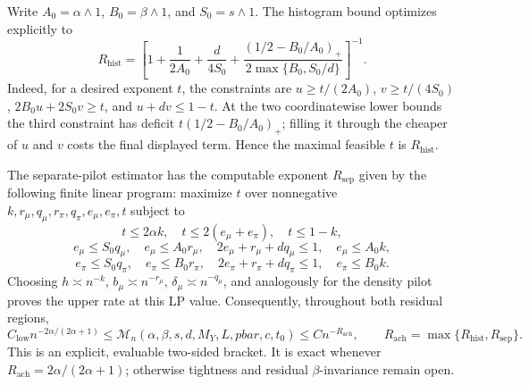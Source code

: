Write \(A_0=\alpha\wedge1\), \(B_0=\beta\wedge1\), and \(S_0=s\wedge1\). The histogram bound optimizes explicitly to
\[
R_{\mathrm{hist}}=\left[1+\frac1{2A_0}+\frac{d}{4S_0}+\frac{(1/2-B_0/A_0)_+}{2\max\{B_0,S_0/d\}}\right]^{-1}.
\]
Indeed, for a desired exponent \(t\), the constraints are \(u\ge t/(2A_0)\), \(v\ge t/(4S_0)\), \(2B_0u+2S_0v\ge t\), and \(u+dv\le1-t\). At the two coordinatewise lower bounds the third constraint has deficit \(t(1/2-B_0/A_0)_+\); filling it through the cheaper of \(u\) and \(v\) costs the final displayed term. Hence the maximal feasible \(t\) is \(R_{\mathrm{hist}}\).

The separate-pilot estimator has the computable exponent \(R_{\mathrm{sep}}\) given by the following finite linear program: maximize \(t\) over nonnegative \(k,r_\mu,q_\mu,r_\pi,q_\pi,e_\mu,e_\pi,t\) subject to
\[
t\le2\alpha k,
\quad t\le2(e_\mu+e_\pi),
\quad t\le1-k,
\]
\[
e_\mu\le S_0q_\mu,
\quad e_\mu\le A_0r_\mu,
\quad 2e_\mu+r_\mu+dq_\mu\le1,
\quad e_\mu\le A_0k,
\]
\[
e_\pi\le S_0q_\pi,
\quad e_\pi\le B_0r_\pi,
\quad 2e_\pi+r_\pi+dq_\pi\le1,
\quad e_\pi\le B_0k.
\]
Choosing \(h\asymp n^{-k}\), \(b_\mu\asymp n^{-r_\mu}\), \(\delta_\mu\asymp n^{-q_\mu}\), and analogously for the density pilot proves the upper rate at this LP value. Consequently, throughout both residual regions,
\[
C_{\mathrm{low}}n^{-2\alpha/(2\alpha+1)}
\le\mathcal M_n(\alpha,\beta,s,d,M_Y,L,pbar,c,t_0)
\le Cn^{-R_{\mathrm{ach}}},
\qquad
R_{\mathrm{ach}}=\max\{R_{\mathrm{hist}},R_{\mathrm{sep}}\}.
\]
This is an explicit, evaluable two-sided bracket. It is exact whenever \(R_{\mathrm{ach}}=2\alpha/(2\alpha+1)\); otherwise tightness and residual \(\beta\)-invariance remain open.